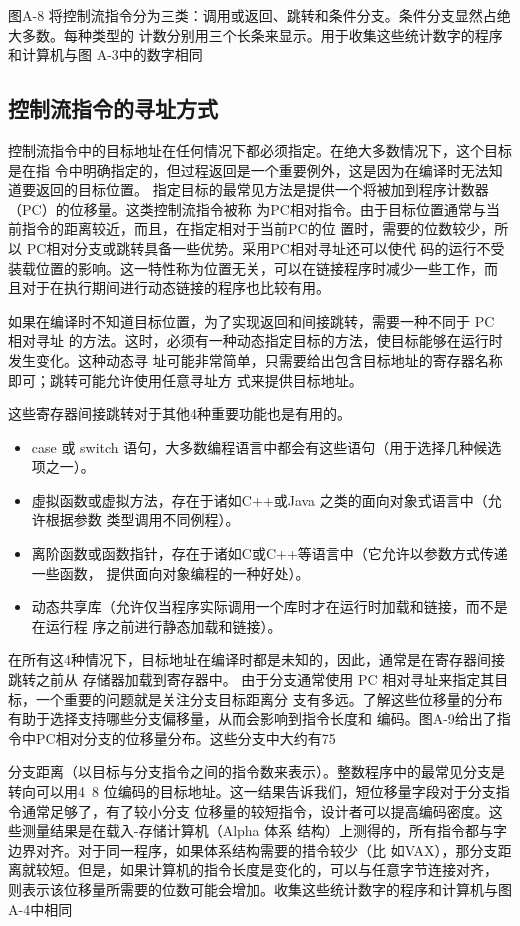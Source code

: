 图A-8 将控制流指令分为三类：调用或返回、跳转和条件分支。条件分支显然占绝大多数。每种类型的
计数分别用三个长条来显示。用于收集这些统计数字的程序和计算机与图 A-3中的数字相同

\subsection{控制流指令的寻址方式}

控制流指令中的目标地址在任何情况下都必须指定。在绝大多数情况下，这个目标是在指
令中明确指定的，但过程返回是一个重要例外，这是因为在编译时无法知道要返回的目标位置。
指定目标的最常见方法是提供一个将被加到程序计数器（PC）的位移量。这类控制流指令被称
为PC相对指令。由于目标位置通常与当前指令的距离较近，而且，在指定相对于当前PC的位
置时，需要的位数较少，所以 PC相对分支或跳转具备一些优势。采用PC相对寻址还可以使代
码的运行不受装载位置的影响。这一特性称为位置无关，可以在链接程序时减少一些工作，而
且对于在执行期间进行动态链接的程序也比较有用。

如果在编译时不知道目标位置，为了实现返回和间接跳转，需要一种不同于 PC 相对寻址
的方法。这时，必须有一种动态指定目标的方法，使目标能够在运行时发生变化。这种动态寻
址可能非常简单，只需要给出包含目标地址的寄存器名称即可；跳转可能允许使用任意寻址方
式来提供目标地址。

这些寄存器间接跳转对于其他4种重要功能也是有用的。

\begin{itemize}
    \item case 或 switch 语句，大多数编程语言中都会有这些语句（用于选择几种候选项之一）。
    \item 虛拟函数或虚拟方法，存在于诸如C++或Java 之类的面向对象式语言中（允许根据参数
    类型调用不同例程）。
    \item 离阶函数或函数指针，存在于诸如C或C++等语言中（它允许以参数方式传递一些函数，
    提供面向对象编程的一种好处）。
    \item 动态共享库（允许仅当程序实际调用一个库时才在运行时加载和链接，而不是在运行程
    序之前进行静态加载和链接）。
\end{itemize}

在所有这4种情况下，目标地址在编译时都是未知的，因此，通常是在寄存器间接跳转之前从
存储器加载到寄存器中。
由于分支通常使用 PC 相对寻址来指定其目标，一个重要的问题就是关注分支目标距离分
支有多远。了解这些位移量的分布有助于选择支持哪些分支偏移量，从而会影响到指令长度和
编码。图A-9给出了指令中PC相对分支的位移量分布。这些分支中大约有75%

分支距离（以目标与分支指令之间的指令数来表示）。整数程序中的最常见分支是转向可以用4~8
位编码的目标地址。这一结果告诉我们，短位移量字段对于分支指令通常足够了，有了较小分支
位移量的较短指令，设计者可以提高编码密度。这些测量结果是在载入-存储计算机（Alpha 体系
结构）上测得的，所有指令都与字边界对齐。对于同一程序，如果体系结构需要的措令较少（比
如VAX），那分支距离就较短。但是，如果计算机的指令长度是变化的，可以与任意字节连接对齐，
则表示该位移量所需要的位数可能会增加。收集这些统计数字的程序和计算机与图A-4中相同

